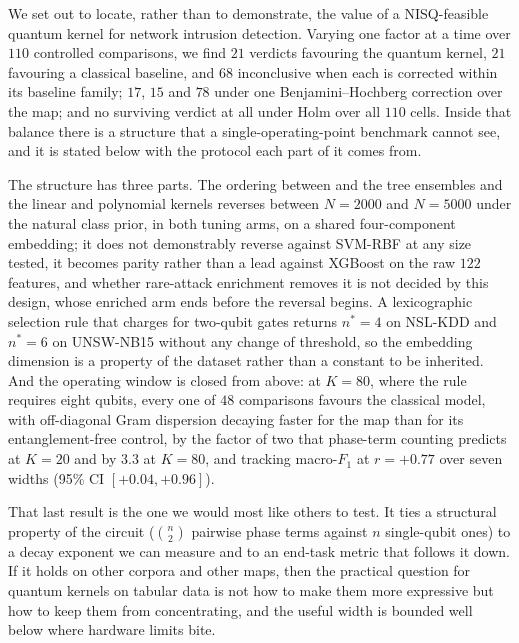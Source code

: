 %

\begin{revbody}
We set out to locate, rather than to demonstrate, the value of a NISQ-feasible
quantum kernel for network intrusion detection. Varying one factor at a time
over $110$ controlled comparisons, we find $21$ verdicts favouring the quantum
kernel, $21$ favouring a classical baseline, and $68$ inconclusive when each
is corrected within its baseline family; $17$, $15$ and $78$ under one
Benjamini--Hochberg correction over the map; and no surviving verdict at all
under Holm over all $110$ cells. Inside that balance there is a structure that
a single-operating-point benchmark cannot see, and it is stated below with the
protocol each part of it comes from.

The structure has three parts. The ordering between \QSVM{} and the tree
ensembles and the linear and polynomial kernels reverses between $N=2000$ and
$N=5000$ under the natural class prior, in both tuning arms, on a shared
four-component embedding; it does not demonstrably reverse against SVM-RBF at
any size tested, it becomes parity rather than a lead against XGBoost on the raw
$122$ features, and whether rare-attack enrichment removes it is not decided by
this design, whose enriched arm ends before the reversal begins. A
lexicographic selection rule that charges for two-qubit gates returns
$n^{\ast}=4$ on NSL-KDD and $n^{\ast}=6$ on UNSW-NB15 without any change of
threshold, so the embedding dimension is a property of the dataset rather than a
constant to be inherited. And the operating window is closed from above: at
$K=80$, where the rule requires eight qubits, every one of $48$ comparisons
favours the classical model, with off-diagonal Gram dispersion decaying faster
for the \ZZ{} map than for its entanglement-free control, by the factor of two
that phase-term counting predicts at $K=20$ and by $3.3$ at $K=80$, and tracking
macro-$F_1$ at $r=+0.77$ over seven widths (95\% CI $[+0.04,+0.96]$).

That last result is the one we would most like others to test. It ties a
structural property of the circuit ($\binom{n}{2}$ pairwise phase terms
against $n$ single-qubit ones) to a decay exponent we can measure and to an
end-task metric that follows it down. If it holds on other corpora and other
maps, then the practical question for quantum kernels on tabular data is not how
to make them more expressive but how to keep them from concentrating, and the
useful width is bounded well below where hardware limits bite.


\end{revbody}

